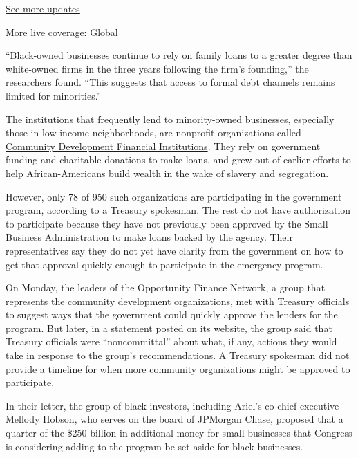 \href{https://www.nytimes3xbfgragh.onion/live/2020/08/03/business/stock-market-today-coronavirus?action=click\&pgtype=Article\&state=default\&region=MAIN_CONTENT_1\&context=storylines_live_updates}{See
more updates}

More live coverage:
\href{https://www.nytimes3xbfgragh.onion/2020/08/04/world/coronavirus-covid-19.html?action=click\&pgtype=Article\&state=default\&region=MAIN_CONTENT_1\&context=storylines_live_updates}{Global}

``Black-owned businesses continue to rely on family loans to a greater
degree than white-owned firms in the three years following the firm's
founding,'' the researchers found. ``This suggests that access to formal
debt channels remains limited for minorities.''

The institutions that frequently lend to minority-owned businesses,
especially those in low-income neighborhoods, are nonprofit
organizations called
\href{https://www.nytimes3xbfgragh.onion/2020/06/04/business/minority-businesses-damage-lenders.html}{Community
Development Financial Institutions}. They rely on government funding and
charitable donations to make loans, and grew out of earlier efforts to
help African-Americans build wealth in the wake of slavery and
segregation.

However, only 78 of 950 such organizations are participating in the
government program, according to a Treasury spokesman. The rest do not
have authorization to participate because they have not previously been
approved by the Small Business Administration to make loans backed by
the agency. Their representatives say they do not yet have clarity from
the government on how to get that approval quickly enough to participate
in the emergency program.

On Monday, the leaders of the Opportunity Finance Network, a group that
represents the community development organizations, met with Treasury
officials to suggest ways that the government could quickly approve the
lenders for the program. But later,
\href{https://ofn.org/articles/paycheck-protection-program-update-cdfi-eligibility}{in
a statement} posted on its website, the group said that Treasury
officials were ``noncommittal'' about what, if any, actions they would
take in response to the group's recommendations. A Treasury spokesman
did not provide a timeline for when more community organizations might
be approved to participate.

In their letter, the group of black investors, including Ariel's
co-chief executive Mellody Hobson, who serves on the board of JPMorgan
Chase, proposed that a quarter of the \$250 billion in additional money
for small businesses that Congress is considering adding to the program
be set aside for black businesses.

